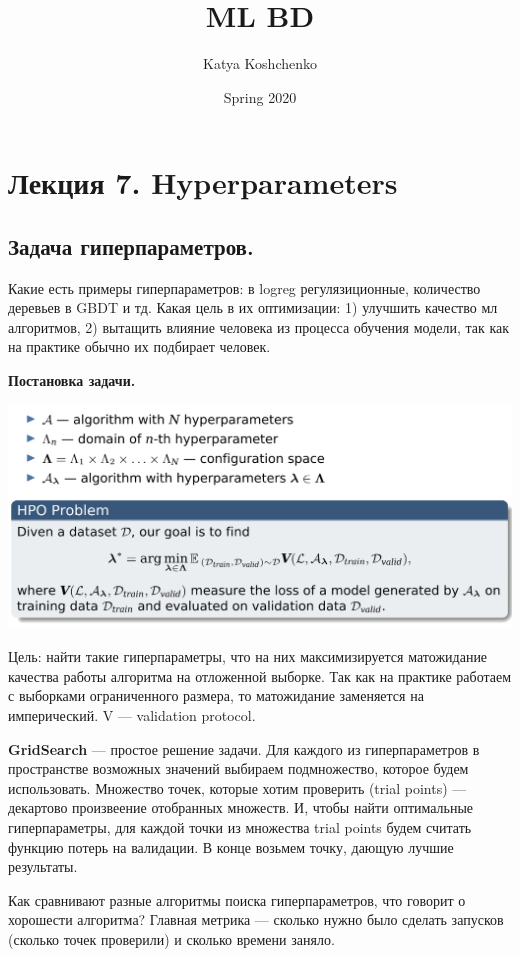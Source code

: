 \documentclass[12pt]{article}
\title{ML BD}
\date{Spring 2020}
\begin{document}
\author{Katya Koshchenko}
\maketitle

\section{Лекция 7. Hyperparameters}
\subsection{Задача гиперпараметров.}
Какие есть примеры гиперпараметров: в logreg регулязиционные, количество деревьев в GBDT и тд. Какая цель в их оптимизации: 1) улучшить качество мл алгоритмов, 2) вытащить влияние человека из процесса обучения модели, так как на практике обычно их подбирает человек.

\textbf{Постановка задачи.}
\begin{center}
    \includegraphics[scale=0.4]{lecture7_problem.png}
\end{center}
Цель: найти такие гиперпараметры, что на них максимизируется матожидание качества работы алгоритма на отложенной выборке. Так как на практике работаем с выборками ограниченного размера, то матожидание заменяется на имперический. V --- validation protocol.

\textbf{GridSearch} --- простое решение задачи. Для каждого из гиперпараметров в пространстве возможных значений выбираем подмножество, которое будем использовать. Множество точек, которые хотим проверить (trial points) --- декартово произвеение отобранных множеств. И, чтобы найти оптимальные гиперпараметры, для каждой точки из множества trial points будем считать функцию потерь на валидации. В конце возьмем точку, дающую лучшие результаты. 

Как сравнивают разные алгоритмы поиска гиперпараметров, что говорит о хорошести алгоритма? Главная метрика --- сколько нужно было сделать запусков (сколько точек проверили) и сколько времени заняло.
\end{document}
